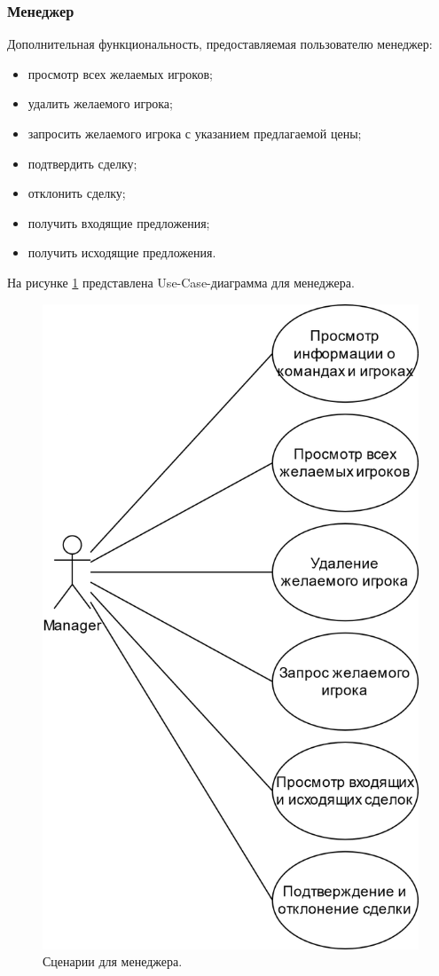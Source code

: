 \subsubsection{Менеджер}
Дополнительная функциональность, предоставляемая пользователю менеджер:
\begin{itemize}
	\item[1)] просмотр всех желаемых игроков;
	\item[2)] удалить желаемого игрока; 
	\item[3)] запросить желаемого игрока с указанием предлагаемой цены;
	\item[4)] подтвердить сделку;
	\item[5)] отклонить сделку;
	\item[6)] получить входящие предложения;
	\item[7)] получить исходящие предложения.    
\end{itemize}
На рисунке \ref{img:UseCaseManager} представлена Use-Case-диаграмма для менеджера.
\begin{figure}[h!]
	\centering
	\includegraphics[scale=0.25]{img/UseCaseManager.png}
	\caption{Сценарии для менеджера.}
	\label{img:UseCaseManager}
\end{figure}

